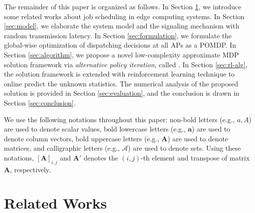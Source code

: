 The remainder of this paper is organized as follows.
In Section \ref{sec:review}, we introduce some related works about job scheduling in edge computing systems.
In Section \ref{sec:model}, we elaborate the system model and the signaling mechanism with random transmission latency.
In Section \ref{sec:formulation}, we formulate the global-wise optimization of dispatching decisions at all APs as a POMDP.
In Section \ref{sec:algorithm}, we propose a novel low-complexity approximate MDP solution framework via \emph{alternative policy iteration}, called \algname.
In Section \ref{sec:rl-alg}, the solution framework is extended with reinforcement learning technique to online predict the unknown statistics.
The numerical analysis of the proposed solution is provided in Section \ref{sec:evaluation}, and the conclusion is drawn in Section \ref{sec:conclusion}.

We use the following notations throughout this paper: 
non-bold letters (e.g., $a, A$) are used to denote scalar values,
bold lowercase letters (e.g., $\mathbf{a}$) are used to denote column vectors,
bold uppercase letters (e.g., $\mathbf{A}$) are used to denote matrices,
and calligraphic letters (e.g., $\mathcal{A}$) are used to denote sets.
Using these notations, $[\mathbf{A}]_{i,j}$ and $\mathbf{A}'$ denotes the $(i,j)$-th element and transpose of matrix $\mathbf{A}$, respectively.

\section{Related Works}
\label{sec:review}

